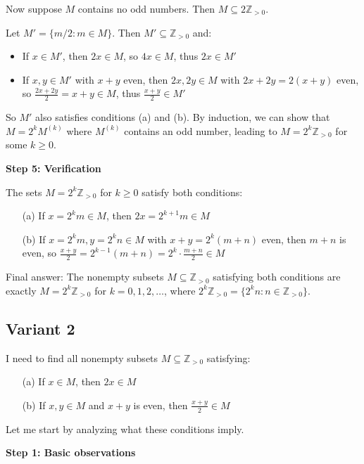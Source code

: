 \documentclass[12pt,a4paper]{article}
\theoremstyle{definition}
\begin{document}
    Now suppose $M$ contains no odd numbers. Then $M \subseteq 2\mathbb{Z}_{>0}$.

    Let $M' = \{m/2 : m \in M\}$. Then $M' \subseteq \mathbb{Z}_{>0}$ and:
    \begin{itemize}
        \item If $x \in M'$, then $2x \in M$, so $4x \in M$, thus $2x \in M'$
        \item If $x,y \in M'$ with $x+y$ even, then $2x, 2y \in M$ with $2x + 2y = 2(x+y)$ even, so $\frac{2x+2y}{2} = x+y \in M$, thus $\frac{x+y}{2} \in M'$
    \end{itemize}

    So $M'$ also satisfies conditions (a) and (b). By induction, we can show that $M = 2^k M^{(k)}$ where $M^{(k)}$ contains an odd number, leading to $M = 2^k \mathbb{Z}_{>0}$ for some $k \geq 0$.

    \textbf{Step 5: Verification}

    The sets $M = 2^k \mathbb{Z}_{>0}$ for $k \geq 0$ satisfy both conditions:
    \begin{itemize}
        \item[(a)] If $x = 2^k m \in M$, then $2x = 2^{k+1} m \in M$ \checkmark
        \item[(b)] If $x = 2^k m, y = 2^k n \in M$ with $x + y = 2^k(m+n)$ even, then $m + n$ is even, so $\frac{x+y}{2} = 2^{k-1}(m+n) = 2^k \cdot \frac{m+n}{2} \in M$ \checkmark
    \end{itemize}

    Final answer: The nonempty subsets $M \subseteq \mathbb{Z}_{>0}$ satisfying both conditions are exactly $M = 2^k \mathbb{Z}_{>0}$ for $k = 0, 1, 2, \ldots$, where $2^k \mathbb{Z}_{>0} = \{2^k n : n \in \mathbb{Z}_{>0}\}$.
\subsection{Variant 2}
    I need to find all nonempty subsets $M \subseteq \mathbb{Z}_{>0}$ satisfying:
    \begin{itemize}
        \item[(a)] If $x \in M$, then $2x \in M$
        \item[(b)] If $x,y \in M$ and $x + y$ is even, then $\frac{x + y}{2} \in M$
    \end{itemize}

    Let me start by analyzing what these conditions imply.

    \textbf{Step 1: Basic observations}
\end{document}
